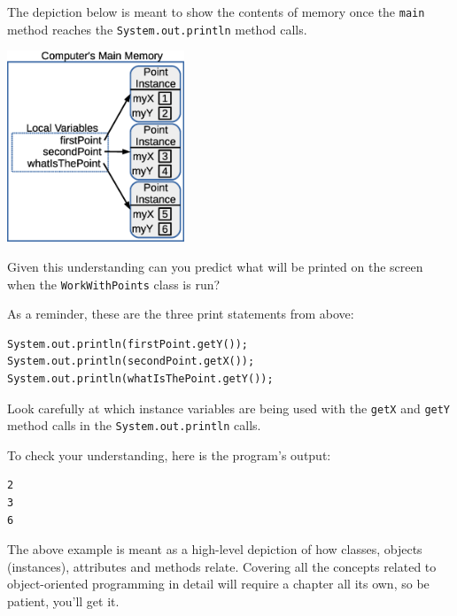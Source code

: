 The depiction below is meant to show the contents of memory once the \texttt{main} method reaches the \texttt{System.out.println} method calls.

\beforefig
\centerline{\includegraphics[height=2.25in]{figs2/ObjectsAndAttributes.eps}}
\afterfig

Given this understanding can you predict what will be printed on the screen when the \texttt{WorkWithPoints} class is run? 

As a reminder, these are the three print statements from above:

\beforeverb
\begin{verbatim}
System.out.println(firstPoint.getY());
System.out.println(secondPoint.getX());
System.out.println(whatIsThePoint.getY());
\end{verbatim}
\afterverb

Look carefully at which instance variables are being used with the \texttt{getX} and \texttt{getY} method calls in the \texttt{System.out.println} calls.

To check your understanding, here is the program's output:

\beforeverb
\begin{verbatim}
2
3
6
\end{verbatim}
\afterverb


The above example is meant as a high-level depiction of how classes, objects (instances), attributes and methods relate. Covering all the concepts related to object-oriented programming in detail will require a chapter all its own, so be patient, you'll get it.
